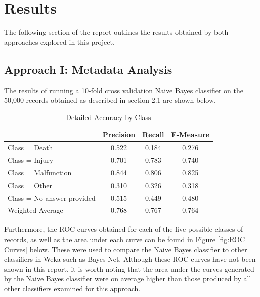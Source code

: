 \documentclass[11pt, notitlepage,abstracton,oneside]{article}   	%
\begin{document}
\section{Results}
The following section of the report outlines the results obtained by both approaches explored in this project.

\subsection{Approach I: Metadata Analysis}
The results of running a 10-fold cross validation Naive Bayes classifier on the 50,000 records obtained as described in section 2.1 are shown below.

\begin{table}[htdp]
\caption{Detailed Accuracy by Class}
\begin{center}
\begin{tabular}{|l|c|c|c|}
\hline
& Precision & Recall & F-Measure \\ \hline
Class = Death & 0.522 & 0.184 & 0.276 \\ \hline
Class = Injury & 0.701 & 0.783 & 0.740 \\ \hline
Class = Malfunction & 0.844 & 0.806 & 0.825 \\ \hline
Class = Other & 0.310 & 0.326 & 0.318 \\ \hline
Class = No answer provided & 0.515 & 0.449 & 0.480 \\ \hline
Weighted Average & 0.768 & 0.767 & 0.764 \\ \hline
\end{tabular}
\end{center}
\label{default}
\end{table}

Furthermore, the ROC curves obtained for each of the five possible classes of records, as well as the area under each curve can be found in Figure \ref{fig:ROC Curves} below. These were used to compare the Naive Bayes classifier to other classifiers in Weka such as Bayes Net. Although these ROC curves have not been shown in this report, it is worth noting that the area under the curves generated by the Naive Bayes classifier were on average higher than those produced by all other classifiers examined for this approach.
\end{document}
